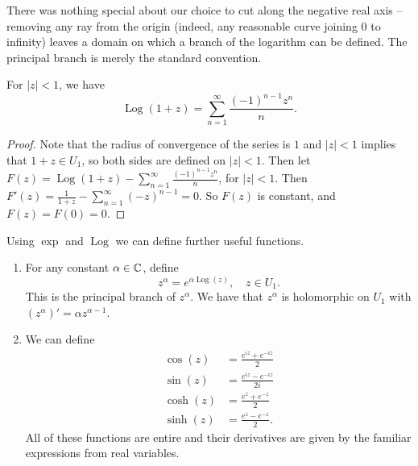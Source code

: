 \documentclass[a4paper]{scrartcl}
\begin{document}
\begin{center}
\end{center}

There was nothing special about our choice to cut along the negative real axis -- removing any ray from the origin (indeed, any reasonable curve joining $0$ to infinity) leaves a domain on which a branch of the logarithm can be defined. The principal branch is merely the standard convention.

\begin{proposition}
    For $|z| < 1$, we have
    $$
    \operatorname{Log}(1 + z)=\sum_{n=1}^{\infty} \frac{(-1)^{n-1} z^{n}}{n}.
    $$
\end{proposition}
\begin{proof}
    Note that the radius of convergence of the series is $1$ and $|z| < 1$ implies that $1 + z \in U_1$, so both sides are defined on $|z| < 1$. Then let $F(z) = \operatorname{Log}(1 + z) - \sum_{n=1}^{\infty} \frac{(-1)^{n-1} z^{n}}{n}$, for $|z| < 1$. Then $F'(z) = \frac{1}{1 + z} - \sum_{n = 1}^{\infty} (-z)^{n - 1} = 0$. So $F(z)$ is constant, and $F(z) = F(0) = 0$.
\end{proof}

Using $\exp$ and $\operatorname{Log}$ we can define further useful functions.

\begin{enumerate}[label=(\roman*)]
    \item For any constant $\alpha \in \mathbb{C}$, define
    $$
    z^{\alpha} = e^{\alpha \operatorname{Log}(z)}, \quad z \in U_1.
    $$
    This is the principal branch of $z^\alpha$. We have that $z^{\alpha}$ is holomorphic on $U_1$ with $(z^{\alpha})' = \alpha z^{\alpha - 1}$.

    \item We can define
    \begin{align*}
        \cos(z) &= \frac{e^{iz} + e^{-iz}}{2}\\ 
        \sin(z) &= \frac{e^{iz} - e^{-iz}}{2i}\\
        \cosh(z) &= \frac{e^{z} + e^{-z}}{2} \\
        \sinh(z) &= \frac{e^z - e^{-z}}{2}.
    \end{align*}
    All of these functions are entire and their derivatives are given by the familiar expressions from real variables.
\end{enumerate}
\end{document}
